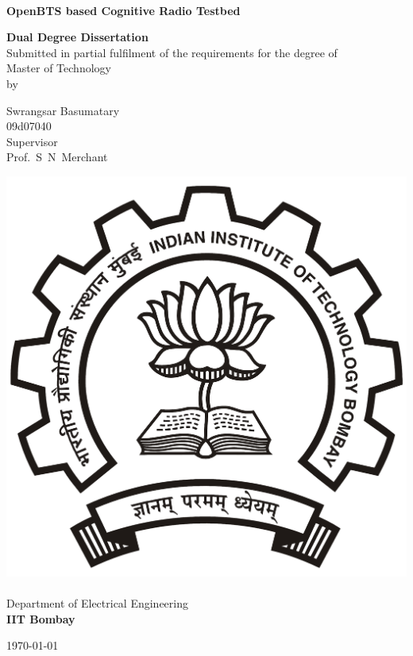 \begin{titlepage}
\begin{center}
\begin{spacing}{1.0}


~\\[0.3cm]
{ \LARGE \bfseries OpenBTS based Cognitive Radio Testbed\\[1.2cm] }

\textbf{\large Dual Degree Dissertation}\\[1.2cm]

{Submitted in partial fulfilment of the requirements for the degree 
of\\[0.1cm]
Master of Technology\\[0.3cm]
by\\[0.3cm]}

{\LARGE Swrangsar Basumatary \\[0.1cm]}
{09d07040 \\[1.1cm]}
{Supervisor \\[0.1cm]}
{\LARGE Prof.~S~N~Merchant \\[1.3cm]}

\includegraphics[width=0.21\textheight]{iitbLogo}~\\[0.9cm]
Department of Electrical Engineering\\[0.2cm]
\textbf{\large IIT Bombay}\\[1.3cm]


\vfill

{\large \mydate\today}

\end{spacing}
\end{center}
\end{titlepage}
